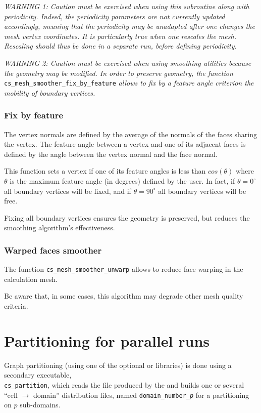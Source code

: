{{{\em WARNING 1: Caution must be exercised when using this subroutine
along with periodicity. Indeed, the periodicity parameters are not
currently updated accordingly, meaning that the periodicity may be
unadapted after one changes the mesh vertex coordinates. It is particularly
true when one rescales the mesh. Rescaling should thus be done
in a separate run, before defining periodicity.}

{\em WARNING 2: Caution must be exercised when using smoothing utilities
because the geometry may be modified. In order to preserve geometry,
the function} \texttt{cs\_mesh\_smoother\_fix\_by\_feature} {\em allows to 
fix by a feature angle criterion the mobility of boundary vertices.}

\subsubsection{Fix by feature}
The vertex normals are defined by the average of the normals of the
faces sharing the vertex.
The feature angle between a vertex and one of its adjacent faces is defined
by the angle between the vertex normal and the face normal.

This function sets a vertex if one of its feature angles is less than
$cos(\theta)$ where $\theta$ is the maximum feature angle (in degrees)
defined by the user.
In fact, if $\theta = 0^{\circ}$ all boundary vertices will be fixed, and 
if $\theta = 90^{\circ}$ all boundary vertices will be free.

Fixing all boundary vertices ensures the geometry is preserved, but reduces
the smoothing algorithm's effectiveness.

\subsubsection{Warped faces smoother}

The function \texttt{cs\_mesh\_smoother\_unwarp} allows to reduce face warping
in the calculation mesh.

Be aware that, in some cases, this algorithm may degrade other mesh quality 
criteria.

\section{Partitioning for parallel runs\label{sec:parall}}

Graph partitioning (using one of the optional \metis or
\scotch libraries) is done using a secondary executable,\\
\texttt{cs\_partition},
which reads the file produced by the \pcs and builds one or
several ``cell $\rightarrow$ domain'' distribution files, named
{\tt domain\_number\_\it{p}} for a partitioning on $p$ sub-domains.

}}
